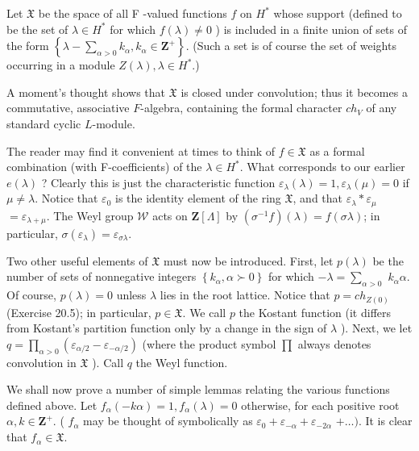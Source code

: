\documentclass[10pt]{article}
\begin{document}
Let $\mathfrak{X}$ be the space of all F -valued functions $f$ on $H^{*}$ whose support (defined to be the set of $\lambda \in H^{*}$ for which $f(\lambda) \neq 0$ ) is included in a finite union of sets of the form $\left\{\lambda-\sum_{\alpha>0} k_{\alpha}, k_{\alpha} \in \mathbf{Z}^{+}\right\}$. (Such a set is of course the set of weights occurring in a module $Z(\lambda), \lambda \in H^{*}$.)

A moment's thought shows that $\mathfrak{X}$ is closed under convolution; thus it becomes a commutative, associative $F$-algebra, containing the formal character $c h_{V}$ of any standard cyclic $L$-module.

The reader may find it convenient at times to think of $f \in \mathfrak{X}$ as a formal combination (with F-coefficients) of the $\lambda \in H^{*}$. What corresponds to our earlier $e(\lambda)$ ? Clearly this is just the characteristic function $\varepsilon_{\lambda}(\lambda)=1, \varepsilon_{\lambda}(\mu)=0$ if $\mu \neq \lambda$. Notice that $\varepsilon_{0}$ is the identity element of the ring $\mathfrak{X}$, and that $\varepsilon_{\lambda} * \varepsilon_{\mu}$ $=\varepsilon_{\lambda+\mu}$. The Weyl group $\mathscr{W}$ acts on $\mathbf{Z}[\Lambda]$ by $\left(\sigma^{-1} f\right)(\lambda)=f(\sigma \lambda)$; in particular, $\sigma\left(\varepsilon_{\lambda}\right)=\varepsilon_{\sigma \lambda}$.

Two other useful elements of $\mathfrak{X}$ must now be introduced. First, let $p(\lambda)$ be the number of sets of nonnegative integers $\left\{k_{\alpha}, \alpha \succ 0\right\}$ for which $-\lambda=\sum_{\alpha>0}$ $k_{\alpha} \alpha$. Of course, $p(\lambda)=0$ unless $\lambda$ lies in the root lattice. Notice that $p=c h_{Z(0)}$\\
(Exercise 20.5); in particular, $p \in \mathfrak{X}$. We call $p$ the Kostant function (it differs from Kostant's partition function only by a change in the sign of $\lambda$ ). Next, we let $q=\prod_{\alpha>0}\left(\varepsilon_{\alpha / 2}-\varepsilon_{-\alpha / 2}\right)$ (where the product symbol $\prod$ always denotes convolution in $\mathfrak{X}$ ). Call $q$ the Weyl function.

We shall now prove a number of simple lemmas relating the various functions defined above. Let $f_{\alpha}(-k \alpha)=1, f_{\alpha}(\lambda)=0$ otherwise, for each positive root $\alpha, k \in \mathbf{Z}^{+}$. ( $f_{\alpha}$ may be thought of symbolically as $\varepsilon_{0}+\varepsilon_{-\alpha}+\varepsilon_{-2 \alpha}$ $+\ldots)$. It is clear that $f_{\alpha} \in \mathfrak{X}$.
\end{document}
